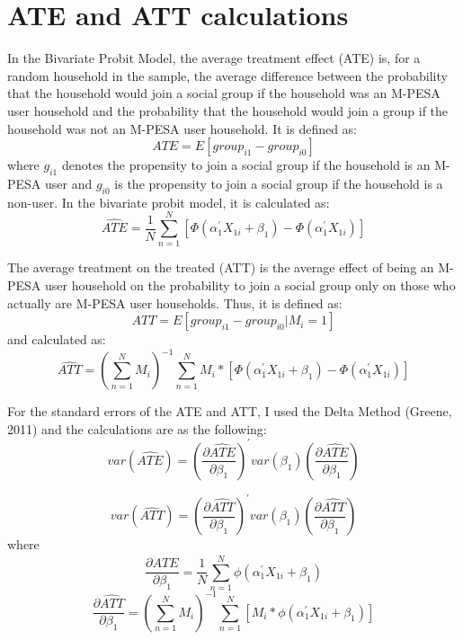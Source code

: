 \documentclass[11pt]{article}
\numberwithin{equation}{section}
\begin{document}
\section{ATE and ATT calculations}

In the Bivariate Probit Model, the average treatment effect (ATE) is, for a random household in the sample, the average difference between the probability that the household would join a social group if the household was an M-PESA user household and the probability that the household would join a group if the household was not an M-PESA user household. It is defined as: 
\begin{equation}
ATE= E[group_{i1} - group_{i0}]
\end{equation}
where $g_{i1}$ denotes the propensity to join a social group if the household is an M-PESA user and $g_{i0}$ is the propensity to join a social group if the household is a non-user. In the bivariate probit model, it is calculated as:
\begin{equation}
\widehat{ATE}= \frac{1}{N} \sum_{n=1}^{N} [ \Phi(\alpha_1 ^{'} X_{1i}+ \beta_1) -  \Phi(\alpha_1 ^{'} X_{1i})  ]
\end{equation}

The average treatment on the treated (ATT) is the average effect of being an M-PESA user household on the probability to join a social group only on those who actually are M-PESA user households. Thus, it is defined as:
\begin{equation}
ATT= E[group_{i1} - group_{i0} | M_i =1 ]
\end{equation}
and calculated as:
\begin{equation}
\widehat{ATT}=  ( \sum_{n=1}^{N} M_i )^{-1} \sum_{n=1}^{N} M_i * [ \Phi(\alpha_1 ^{'} X_{1i}+ \beta_1) -  \Phi(\alpha_1 ^{'} X_{1i})  ]
\end{equation}

For the standard errors of the ATE and ATT, I used the Delta Method (Greene, 2011) and the calculations are as the following:
\begin{equation}
var(\widehat{ATE})= (\frac{\partial \widehat{ATE}}{\partial \beta_1})^{'} var(\beta_1)  (\frac{\partial \widehat{ATE}}{\partial \beta_1})
\end{equation}

\begin{equation}
var(\widehat{ATT})= (\frac{\partial \widehat{ATT}}{\partial \beta_1})^{'} var(\beta_1)  (\frac{\partial \widehat{ATT}}{\partial \beta_1})
\end{equation}
where 
\begin{equation*}
\frac{\partial \widehat{ATE}}{\partial \beta_1} = \frac{1}{N} \sum_{n=1}^{N}  \phi(\alpha_1 ^{'} X_{1i}+ \beta_1)
\end{equation*} 
\begin{equation*}
\frac{\partial \widehat{ATT}}{\partial \beta_1} =  ( \sum_{n=1}^{N} M_i )^{-1} \sum_{n=1}^{N} [M_i *  \phi(\alpha_1 ^{'} X_{1i}+ \beta_1)]
\end{equation*}
\end{document}
